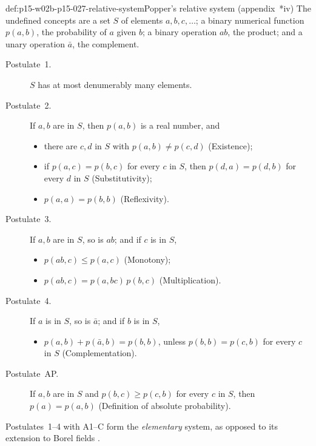 \begin{hbdefinition}{def:p15-w02b-p15-027-relative-system}{Popper's relative system (appendix~*iv)}
The undefined concepts are a set \(S\) of elements \(a,b,c,\ldots\); a
binary numerical function \(p(a,b)\), the probability of \(a\) given
\(b\); a binary operation \(ab\), the product; and a unary operation
\(\bar a\), the complement.
\begin{description}
\item[Postulate~1.] \(S\) has at most denumerably many elements.
\item[Postulate~2.] If \(a,b\) are in \(S\), then \(p(a,b)\) is a real
  number, and
  \begin{itemize}
  \item[A1] there are \(c,d\) in \(S\) with \(p(a,b)\neq p(c,d)\)
    (Existence);
  \item[A2] if \(p(a,c)=p(b,c)\) for every \(c\) in \(S\), then
    \(p(d,a)=p(d,b)\) for every \(d\) in \(S\) (Substitutivity);
  \item[A3] \(p(a,a)=p(b,b)\) (Reflexivity).
  \end{itemize}
\item[Postulate~3.] If \(a,b\) are in \(S\), so is \(ab\); and if \(c\) is
  in \(S\),
  \begin{itemize}
  \item[B1] \(p(ab,c)\leqslant p(a,c)\) (Monotony);
  \item[B2] \(p(ab,c)=p(a,bc)\,p(b,c)\) (Multiplication).
  \end{itemize}
\item[Postulate~4.] If \(a\) is in \(S\), so is \(\bar a\); and if \(b\) is in
  \(S\),
  \begin{itemize}
  \item[C] \(p(a,b)+p(\bar a,b)=p(b,b)\), unless \(p(b,b)=p(c,b)\) for
    every \(c\) in \(S\) (Complementation).
  \end{itemize}
\item[Postulate~AP.] If \(a,b\) are in \(S\) and \(p(b,c)\geqslant p(c,b)\)
  for every \(c\) in \(S\), then \(p(a)=p(a,b)\) (Definition of absolute
  probability).
\end{description}
Postulates~1--4 with A1--C form the \emph{elementary} system, as opposed
to its extension to Borel fields
\parencite[appendix~*iv, pp.~336--337]{Popper2002LogicDiscoveryUI}.
\end{hbdefinition}

